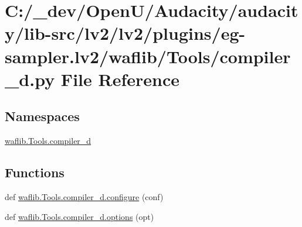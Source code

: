 \hypertarget{lv2_2plugins_2eg-sampler_8lv2_2waflib_2_tools_2compiler__d_8py}{}\section{C\+:/\+\_\+dev/\+Open\+U/\+Audacity/audacity/lib-\/src/lv2/lv2/plugins/eg-\/sampler.lv2/waflib/\+Tools/compiler\+\_\+d.py File Reference}
\label{lv2_2plugins_2eg-sampler_8lv2_2waflib_2_tools_2compiler__d_8py}
\subsection*{Namespaces}
\begin{DoxyCompactItemize}
\item 
 \hyperlink{namespacewaflib_1_1_tools_1_1compiler__d}{waflib.\+Tools.\+compiler\+\_\+d}
\end{DoxyCompactItemize}
\subsection*{Functions}
\begin{DoxyCompactItemize}
\item 
def \hyperlink{namespacewaflib_1_1_tools_1_1compiler__d_a1bde6bb386d77bc326bb0a1b73688c4f}{waflib.\+Tools.\+compiler\+\_\+d.\+configure} (conf)
\item 
def \hyperlink{namespacewaflib_1_1_tools_1_1compiler__d_a4f8b0fc5058863cd242ac3d83ff8f022}{waflib.\+Tools.\+compiler\+\_\+d.\+options} (opt)
\end{DoxyCompactItemize}
